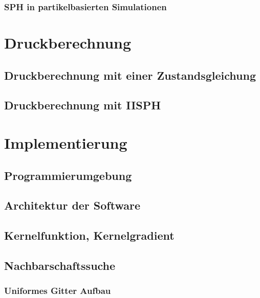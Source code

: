 \documentclass{scrreprt}
\begin{document}
\subsection{SPH in partikelbasierten Simulationen}
\chapter{Druckberechnung}
\section{Druckberechnung mit einer Zustandsgleichung}
\section{Druckberechnung mit IISPH}
\chapter{Implementierung}
\section{Programmierumgebung}
\section{Architektur der Software}
\section{Kernelfunktion, Kernelgradient}
\section{Nachbarschaftssuche}
\subsection{Uniformes Gitter Aufbau}
\end{document}
